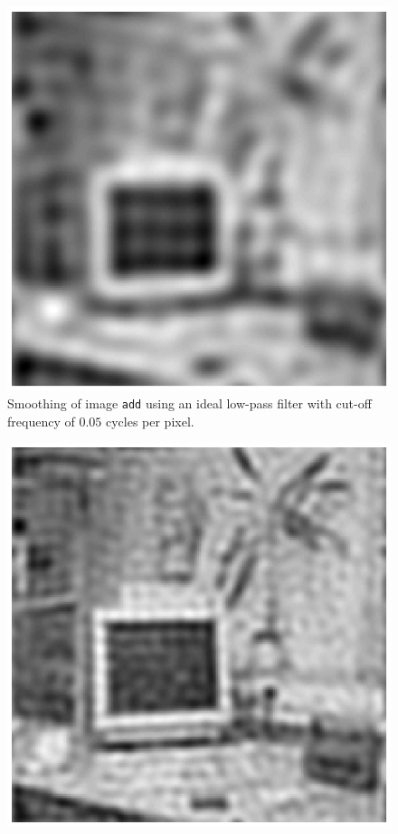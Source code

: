 \begin{minipage}{\linewidth}
  \begin{minipage}{0.4\linewidth}
    \begin{figure}[H]
      \includegraphics[scale=0.5]{./images/Q17/ideal/add_005.eps}
      \caption{Smoothing of image \texttt{add} using an ideal low-pass filter with cut-off frequency of $0.05$ cycles per pixel.}
      \label{fig:Q17_ideal_add_005}
    \end{figure}
  \end{minipage}
  \hspace{0.05\linewidth}
  \begin{minipage}{0.4\linewidth}
    \begin{figure}[H]
      \includegraphics[scale=0.5]{./images/Q17/ideal/sap_01.eps}

\end{figure}
\end{minipage}
\end{minipage}
